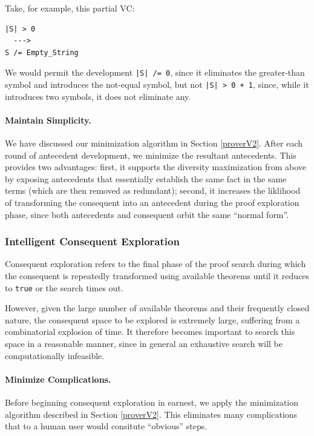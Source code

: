 Take, for example, this partial VC:

\begin{lstlisting}
|S| > 0
  --->
S /= Empty_String
\end{lstlisting}

We would permit the development \texttt{|S| /= 0}, since it eliminates the greater-than symbol and introduces the not-equal symbol, but not \texttt{|S| > 0 + 1}, since, while it introduces two symbols, it does not eliminate any.

\paragraph{Maintain Simplicity.}  We have discussed our minimization algorithm in Section \ref{proverV2}.  After each round of antecedent development, we minimize the resultant antecedents.  This provides two advantages: first, it supports the diversity maximization from above by exposing antecedents that essentially establish the same fact in the same terms (which are then removed as redundant); second, it increases the liklihood of transforming the consequent into an antecedent during the proof exploration phase, since both antecedents and consequent orbit the same ``normal form''.

		\subsubsection{Intelligent Consequent Exploration\label{consequentExploration}}	%

Consequent exploration refers to the final phase of the proof search during which the consequent is repeatedly transformed using available theorems until it reduces to \texttt{true} or the search times out.

However, given the large number of available theorems and their frequently closed nature, the consequent space to be explored is extremely large, suffering from a combinatorial explosion of time.  It therefore becomes important to search this space in a reasonable manner, since in general an exhaustive search will be computationally infeasible.

\paragraph{Minimize Complications.}  Before beginning consequent exploration in earnest, we apply the minimization algorithm described in Section \ref{proverV2}.  This eliminates many complications that to a human user would consitute ``obvious'' steps.

